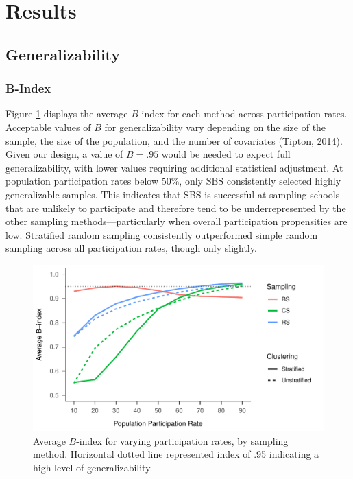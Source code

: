 \documentclass[man,floatsintext]{apa6}
\begin{document}
\hypertarget{results}{%
\section{Results}\label{results}}

\hypertarget{generalizability-1}{%
\subsection{Generalizability}\label{generalizability-1}}

\hypertarget{b-index}{%
\subsubsection{B-Index}\label{b-index}}

Figure \ref{fig:fig-avg-Bindex} displays the average \(B\)-index for each method across participation rates. Acceptable values of \(B\) for generalizability vary depending on the size of the sample, the size of the population, and the number of covariates (Tipton, 2014). Given our design, a value of \(B = .95\) would be needed to expect full generalizability, with lower values requiring additional statistical adjustment. At population participation rates below 50\%, only SBS consistently selected highly generalizable samples. This indicates that SBS is successful at sampling schools that are unlikely to participate and therefore tend to be underrepresented by the other sampling methods---particularly when overall participation propensities are low. Stratified random sampling consistently outperformed simple random sampling across all participation rates, though only slightly.

\begin{figure}
\centering
\includegraphics{GenSamp-Paper_files/figure-latex/fig-avg-Bindex-1.pdf}
\caption{\label{fig:fig-avg-Bindex}Average \(B\)-index for varying participation rates, by sampling method. Horizontal dotted line represented index of .95 indicating a high level of generalizability.}
\end{figure}
\end{document}
